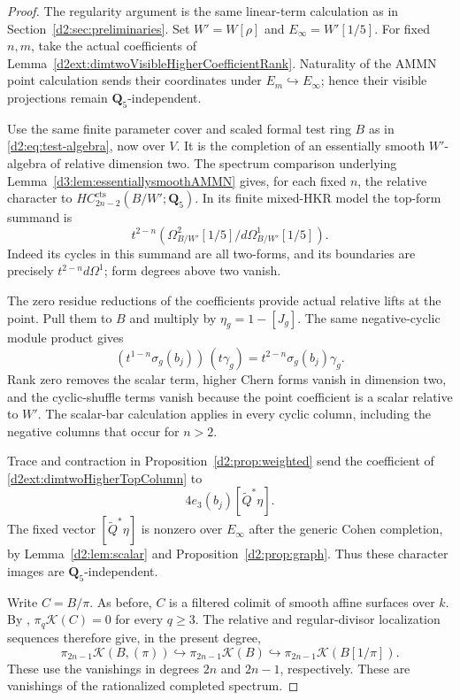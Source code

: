 \documentclass[11pt,a4paper]{amsart}
\numberwithin{equation}{section}
\theoremstyle{definition}
\theoremstyle{remark}
\begin{document}
\begin{proof}
The regularity argument is the same linear-term calculation as in
Section~\ref{d2:sec:preliminaries}.
Set $W'=W[\rho]$ and $E_\infty=W'[1/5]$.
For fixed $n,m$, take the actual coefficients of
Lemma~\ref{d2ext:dimtwoVisibleHigherCoefficientRank}.
Naturality of the AMMN point calculation sends their coordinates
under $E_m\hookrightarrow E_\infty$; hence their visible
projections remain $\mathbf Q_5$-independent.

Use the same finite parameter cover and scaled formal test ring
$B$ as in \eqref{d2:eq:test-algebra}, now over $V$.
It is the completion of an essentially smooth $W'$-algebra
of relative dimension two.  The spectrum comparison underlying
Lemma~\ref{d3:lem:essentiallysmoothAMMN} gives, for each fixed $n$,
the relative character to $HC_{2n-2}^{\mathrm{cts}}(B/W';\mathbf Q_5)$.
In its finite mixed-HKR model the top-form summand is
\begin{equation}
\label{d2ext:dimtwoHigherTopColumn}
 t^{2-n}\left(
 \Omega^2_{B/W'}[1/5]/d\Omega^1_{B/W'}[1/5]\right).
\end{equation}
Indeed its cycles in this summand are all two-forms, and its
boundaries are precisely $t^{2-n}d\Omega^1$; form degrees above
two vanish.

The zero residue reductions of the coefficients provide actual
relative lifts at the point.  Pull them to $B$ and multiply by
$\eta_g=1-[J_g]$.  The same negative-cyclic module product gives
\[
 (t^{1-n}\sigma_g(b_j))\,(t\gamma_g)
           =t^{2-n}\sigma_g(b_j)\gamma_g.
\]
Rank zero removes the scalar term, higher Chern forms vanish in
dimension two, and the cyclic-shuffle terms vanish because the
point coefficient is a scalar relative to $W'$.
The scalar-bar calculation applies in every cyclic column, including
the negative columns that occur for $n>2$.

Trace and contraction in Proposition~\ref{d2:prop:weighted} send the coefficient of \eqref{d2ext:dimtwoHigherTopColumn} to
\[
 4e_3(b_j)[\widetilde Q^*\eta].
\]
The fixed vector $[\widetilde Q^*\eta]$ is nonzero over $E_\infty$ after the
generic Cohen completion, by
Lemma~\ref{d2:lem:scalar} and Proposition~\ref{d2:prop:graph}.
Thus these character images are $\mathbf Q_5$-independent.

Write $C=B/\pi$.  As before, $C$ is a filtered colimit of smooth
affine surfaces over $k$.  By
\cite[Theorem~8.4]{GeisserLevineCharP},
$\pi_q\mathcal K(C)=0$ for every $q\geq3$.
The relative and regular-divisor localization sequences therefore
give, in the present degree,
\[
 \pi_{2n-1}\mathcal K(B,(\pi))
 \hookrightarrow\pi_{2n-1}\mathcal K(B)
 \hookrightarrow\pi_{2n-1}\mathcal K(B[1/\pi]).
\]
These use the vanishings in degrees $2n$ and $2n-1$, respectively.
These are vanishings of the rationalized completed spectrum.


\end{proof}
\end{document}
